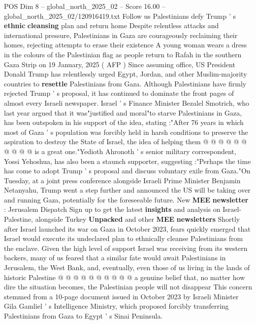 \begin{textsample}{POS Dim 8 – global\_north\_2025\_02 – Score 16.00 – global\_north\_2025\_02/120916419.txt}  \label{ex:f8_pos_003}
Follow us Palestinians defy Trump ' s \textbf{ethnic} \textbf{cleansing} plan and return home Despite relentless attacks and international pressure, Palestinians in Gaza are courageously reclaiming their homes, rejecting attempts to erase their existence A young woman wears a dress in the colours of the Palestinian flag as people return to Rafah in the southern Gaza Strip on 19 January, 2025 ( AFP ) Since assuming office, US President Donald Trump has relentlessly urged Egypt, Jordan, and other Muslim-majority countries to \textbf{resettle} Palestinians from Gaza.
Although Palestinians have firmly rejected Trump ' s proposal, it has continued to dominate the front pages of almost every Israeli newspaper.
Israel ' s Finance Minister Bezalel Smotrich, who last year argued that it was"justified and moral"to starve Palestinians in Gaza, has been outspoken in his support of the idea, stating :"After 76 years in which most of Gaza ' s population was forcibly held in harsh conditions to preserve the aspiration to destroy the State of Israel, the idea of helping them @ @ @ @ @ @ @ @ @ @ is a great one."Yedioth Ahronoth ' s senior military correspondent, Yossi Yehoshua, has also been a staunch supporter, suggesting :"Perhaps the time has come to adopt Trump ' s proposal and discuss voluntary exile from Gaza."On Tuesday, at a joint press conference alongside Israeli Prime Minister Benjamin Netanyahu, Trump went a step further and announced the US will be taking over and running Gaza, potentially for the foreseeable future.
New \textbf{MEE} \textbf{newsletter} : Jerusalem Dispatch Sign up to get the latest \textbf{insights} and analysis on Israel-Palestine, alongside Turkey \textbf{Unpacked} and other \textbf{MEE} \textbf{newsletters} Shortly after Israel launched its war on Gaza in October 2023, fears quickly emerged that Israel would execute its undeclared plan to ethnically cleanse Palestinians from the enclave.
Given the high level of support Israel was receiving from its western backers, many of us feared that a similar fate would await Palestinians in Jerusalem, the West Bank, and, eventually, even those of us living in the lands of historic Palestine @ @ @ @ @ @ @ @ @ @ a genuine belief that, no matter how dire the situation becomes, the Palestinian people will not disappear This concern stemmed from a 10-page document issued in October 2023 by Israeli Minister Gila Gamliel ' s Intelligence Ministry, which proposed forcibly transferring Palestinians from Gaza to Egypt ' s Sinai Peninsula.

\end{textsample}
